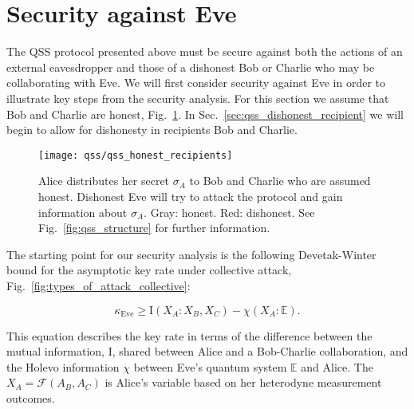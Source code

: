 \section{Security against Eve}\label{sec:qss_honest_recipients}

The QSS protocol presented above must be secure against both the actions of an external eavesdropper and those of a dishonest Bob or Charlie who may be collaborating with Eve. We will first consider security against Eve in order to illustrate key steps from the security analysis. For this section we assume that Bob and Charlie are honest,
Fig.~\ref{fig:qss_honest_recipients}. In Sec.~\ref{sec:qss_dishonest_recipient} we will begin to allow for dishonesty in recipients Bob and Charlie.

\begin{figure}[htp]
\captionsetup{width=\linewidth}
\centering
\texttt{[image: qss/qss\_honest\_recipients]}
\caption{\label{fig:qss_honest_recipients} Alice distributes her secret $\sigma_A$ to Bob and Charlie who are assumed honest. Dishonest Eve will try to attack the protocol and gain information about $\sigma_A$. Gray: honest. Red: dishonest. See Fig.~\ref{fig:qss_structure} for further information.}
\end{figure}


The starting point for our security analysis is the following Devetak-Winter bound \cite{Devetak2004} for the asymptotic key rate under collective attack, Fig.~\ref{fig:types_of_attack_collective}:


\begin{equation}\label{eqn:qss_dw_eve}
\kappa_{\text{Eve}} \ge \text{I}\left(X_A : X_B, X_C\right) - \chi\left(X_A : \mathbb{E}\right).
\end{equation}

\noindent This equation describes the key rate in terms of the difference between the mutual information, $\text{I}$, shared between Alice and a Bob-Charlie collaboration, and the Holevo information $\chi$ between Eve's quantum system $\mathbb{E}$ and Alice. %
The $X_A = \mathcal{F}\left(A_B, A_C\right)$ is Alice's variable based on her heterodyne measurement outcomes.

